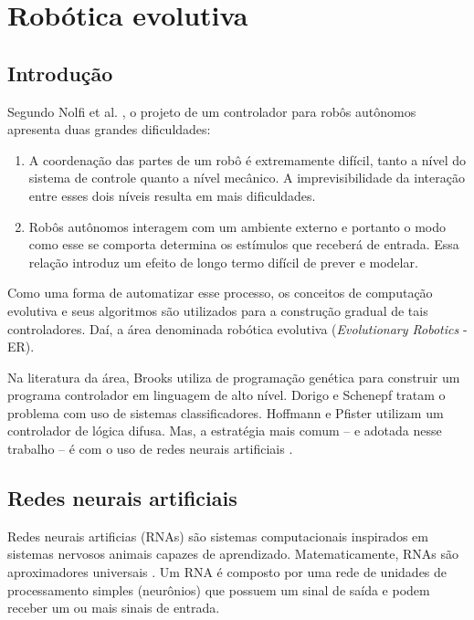 \chapter{Robótica evolutiva}
\label{cha:evolutionary-robotics}

\section{Introdução}

Segundo Nolfi et al. \cite{nolfi1994howtoevolve}, o projeto de um controlador para robôs autônomos apresenta duas grandes dificuldades:

\begin{enumerate}
    \item A coordenação das partes de um robô é extremamente difícil, tanto a nível do sistema de controle quanto a nível mecânico. A imprevisibilidade da interação entre esses dois níveis resulta em mais dificuldades.
    \item Robôs autônomos interagem com um ambiente externo e portanto o modo como esse se comporta determina os estímulos que receberá de entrada. Essa relação introduz um efeito de longo termo difícil de prever e modelar.
\end{enumerate}

Como uma forma de automatizar esse processo, os conceitos de computação evolutiva e seus algoritmos são utilizados para a construção gradual de tais controladores. Daí, a área denominada robótica evolutiva (\textit{Evolutionary Robotics} - ER).

Na literatura da área, Brooks \cite{brooks1992artificiallife} utiliza de programação genética para construir um programa controlador em linguagem de alto nível. Dorigo e Schenepf \cite{dorigo1993geneticsbased} tratam o problema com uso de sistemas classificadores. Hoffmann e Pfister \cite{hoffmann1996evolutionary} utilizam um controlador de lógica difusa. Mas, a estratégia mais comum \cite{nelson2009fitness} -- e adotada nesse trabalho -- é com o uso de redes neurais artificiais \cite{cliff1992evolvingvisually} \cite{miglino1994selection} \cite{nolfi1994phenotypic}.

\section{Redes neurais artificiais}

Redes neurais artificias (RNAs) são sistemas computacionais inspirados em sistemas nervosos animais capazes de aprendizado. Matematicamente, RNAs são aproximadores universais \cite{hornik1989universal}. Um RNA é composto por uma rede de unidades de processamento simples (neurônios) que possuem um sinal de saída e podem receber um ou mais sinais de entrada.

